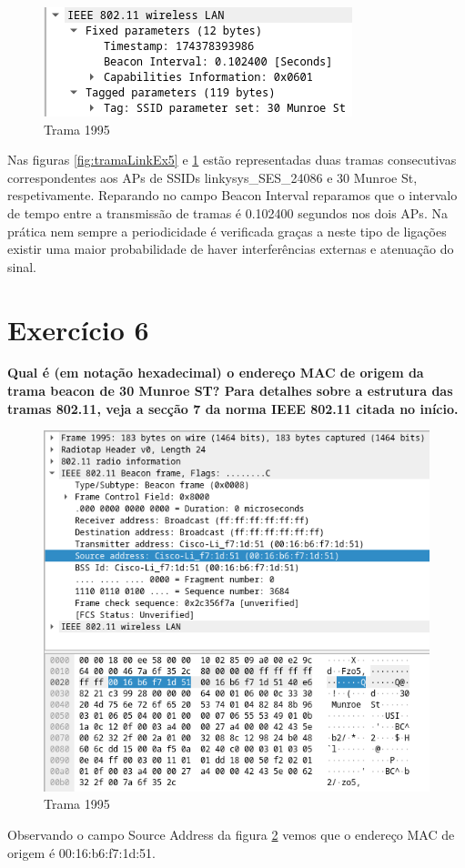\documentclass[a4paper]{report}
\begin{document}
\begin{figure}[H]
    \centering 
    \includegraphics[width=\textwidth]{images/tramaMunEx5.png}  
    \caption{Trama 1995}
    \label{fig:tramaMunEx5}
\end{figure}
Nas figuras \ref{fig:tramaLinkEx5} e \ref{fig:tramaMunEx5} estão representadas duas
tramas consecutivas correspondentes aos APs de SSIDs linkysys\_SES\_24086 e 30
Munroe St, respetivamente. Reparando no campo Beacon Interval reparamos que o
intervalo de tempo entre a transmissão de tramas é 0.102400 segundos nos dois APs.
Na prática nem sempre a periodicidade é verificada graças a neste tipo de
ligações existir uma maior probabilidade de haver interferências externas e
atenuação do sinal.

\section{Exercício 6}
\textbf{Qual é (em notação hexadecimal) o endereço MAC de origem da trama beacon
de 30 Munroe ST? Para detalhes sobre a estrutura das tramas 802.11, veja a
secção 7 da norma IEEE 802.11 citada no início.}

\begin{figure}[H]
    \centering 
    \includegraphics[width=\textwidth]{images/tramaEx6.png}  
    \caption{Trama 1995}
    \label{fig:tramaEx6}
\end{figure}
Observando o campo Source Address da figura \ref{fig:tramaEx6} vemos que o
endereço MAC de origem é 00:16:b6:f7:1d:51.
\end{document}
